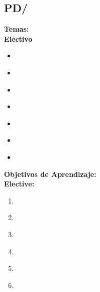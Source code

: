 \subsection{PD/\PDFormalModelsandSemantics}\label{sec:BOK:PDFormalModelsandSemantics}
\noindent \textbf{Temas:}\\
\noindent \textbf{Electivo}
\begin{itemize}
	\item \PDFormalModelsandSemanticsTopicFormal\label{sec:BOK:PDFormalModelsandSemanticsTopicFormal}
	\item \PDFormalModelsandSemanticsTopicFormalModels\label{sec:BOK:PDFormalModelsandSemanticsTopicFormalModels}
	\item \PDFormalModelsandSemanticsTopicFormalModelsOf\label{sec:BOK:PDFormalModelsandSemanticsTopicFormalModelsOf}
	\item \PDFormalModelsandSemanticsTopicModels\label{sec:BOK:PDFormalModelsandSemanticsTopicModels}
	\item \PDFormalModelsandSemanticsTopicAlgorithmic\label{sec:BOK:PDFormalModelsandSemanticsTopicAlgorithmic}
	\item \PDFormalModelsandSemanticsTopicModelsOf\label{sec:BOK:PDFormalModelsandSemanticsTopicModelsOf}
	\item \PDFormalModelsandSemanticsTopicTechniques\label{sec:BOK:PDFormalModelsandSemanticsTopicTechniques}
\end{itemize}


\noindent \textbf{Objetivos de Aprendizaje:}\\
\noindent \textbf{Elective:}
\begin{enumerate}
	\setcounter{enumi}{0}
	\item \PDFormalModelsandSemanticsLOModelA\xspace[\PDFormalModelsandSemanticsLOModelALevel]\label{sec:BOK:PDFormalModelsandSemanticsLOModelA}
	\item \PDFormalModelsandSemanticsLOExplainTheAParallel\xspace[\PDFormalModelsandSemanticsLOExplainTheAParallelLevel]\label{sec:BOK:PDFormalModelsandSemanticsLOExplainTheAParallel}
	\item \PDFormalModelsandSemanticsLOFormally\xspace[\PDFormalModelsandSemanticsLOFormallyLevel]\label{sec:BOK:PDFormalModelsandSemanticsLOFormally}
	\item \PDFormalModelsandSemanticsLOUseAShow\xspace[\PDFormalModelsandSemanticsLOUseAShowLevel]\label{sec:BOK:PDFormalModelsandSemanticsLOUseAShow}
	\item \PDFormalModelsandSemanticsLOUseFormal\xspace[\PDFormalModelsandSemanticsLOUseFormalLevel]\label{sec:BOK:PDFormalModelsandSemanticsLOUseFormal}
	\item \PDFormalModelsandSemanticsLODecide\xspace[\PDFormalModelsandSemanticsLODecideLevel]\label{sec:BOK:PDFormalModelsandSemanticsLODecide}
\end{enumerate}




